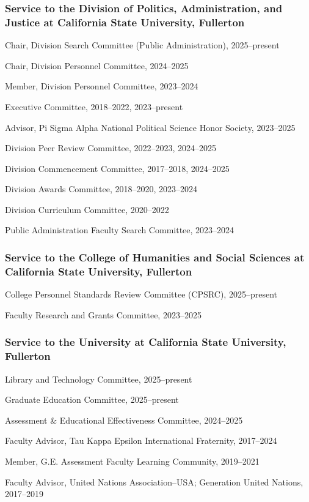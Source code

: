 \documentclass[12pt,letterpaper]{article}
\renewenvironment{itemize}{
  \begin{list}{}{
    \setlength{\leftmargin}{1.5em}
    \setlength{\itemsep}{0.25em}
    \setlength{\parskip}{0pt}
    \setlength{\parsep}{0.25em}
  }
}{
  \end{list}
}
\begin{document}
\subsubsection*{Service to the Division of Politics, Administration, and Justice at California State University, Fullerton}
\begin{itemize}\leftmargin=2pt\itemindent=-15pt
    \item Chair, Division Search Committee (Public Administration), 2025--present
    \item Chair, Division Personnel Committee, 2024--2025
    \item Member, Division Personnel Committee, 2023--2024
    \item Executive Committee, 2018--2022, 2023--present
    \item Advisor, Pi Sigma Alpha National Political Science Honor Society, 2023--2025
    \item Division Peer Review Committee, 2022--2023, 2024--2025
    \item Division Commencement Committee, 2017--2018, 2024--2025
    \item Division Awards Committee, 2018--2020, 2023--2024
    \item Division Curriculum Committee, 2020--2022
    \item Public Administration Faculty Search Committee, 2023--2024
\end{itemize}

\subsubsection*{Service to the College of Humanities and Social Sciences at California State University, Fullerton}
\begin{itemize}\leftmargin=2pt\itemindent=-15pt
    \item College Personnel Standards Review Committee (CPSRC), 2025--present
    \item Faculty Research and Grants Committee, 2023--2025
\end{itemize}

\subsubsection*{Service to the University at California State University, Fullerton}
\begin{itemize}\leftmargin=2pt\itemindent=-15pt
    \item Library and Technology Committee, 2025--present
    \item Graduate Education Committee, 2025--present
    \item Assessment \& Educational Effectiveness Committee, 2024--2025
    \item Faculty Advisor, Tau Kappa Epsilon International Fraternity, 2017--2024
    \item Member, G.E. Assessment Faculty Learning Community, 2019--2021
    \item Faculty Advisor, United Nations Association--USA; Generation United Nations, 2017--2019
\end{itemize}
\end{document}

